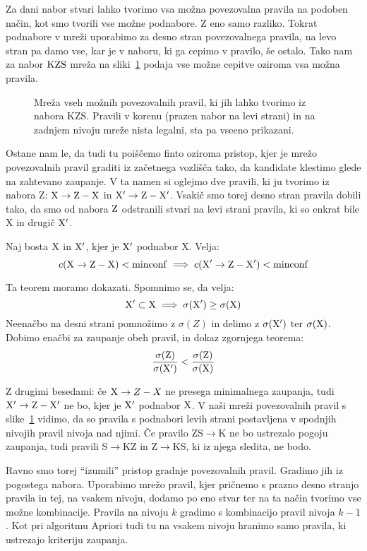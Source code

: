 Za dani nabor stvari lahko tvorimo vsa možna povezovalna pravila na podoben način, kot smo tvorili vse možne podnabore. Z eno samo razliko. Tokrat podnabore v mreži uporabimo za desno stran povezovalnega pravila, na levo stran pa damo vse, kar je v naboru, ki ga cepimo v pravilo, še ostalo. Tako nam za nabor ${\rm KZS}$ mreža na sliki~\ref{f:pravila-kzs} podaja vse možne cepitve oziroma vsa možna pravila.

\begin{figure}[htbp]
\caption{Mreža vseh možnih povezovalnih pravil, ki jih lahko tvorimo iz nabora KZS. Pravili v korenu (prazen nabor na levi strani) in na zadnjem nivoju mreže nista legalni, sta pa vseeno prikazani.}
\label{f:pravila-kzs}
\end{figure}

Ostane nam le, da tudi tu poiščemo finto oziroma pristop, kjer je mrežo povezovalnih pravil graditi iz začetnega vozlišča tako, da kandidate klestimo glede na zahtevano zaupanje. V ta namen si oglejmo dve pravili, ki ju tvorimo iz nabora Z: ${\rm X}\to {\rm Z}-{\rm X}$ in ${\rm X'}\to {\rm Z}-{\rm X}'$. Vsakič smo torej desno stran pravila dobili tako, da smo od nabora ${\rm Z}$ odstranili stvari na levi strani pravila, ki so enkrat bile X in drugič ${\rm X}'$.

\begin{teorem}
  Naj bosta ${\rm X}$ in ${\rm X}'$, kjer je ${\rm X}'$ podnabor {\rm X}. Velja:
  $$c({\rm X}\to {\rm Z}-{\rm X})<{\rm minconf}\implies c({\rm X}'\to {\rm Z}-{\rm X}')<{\rm minconf} $$
\end{teorem}
Ta teorem moramo dokazati. Spomnimo se, da velja:
$$ {\rm X}'\subset {\rm X}\implies\sigma({\rm X}')\geq\sigma({\rm X}) $$
Neenačbo na desni strani pomnožimo z $\sigma(Z)$ in delimo z $\sigma({\rm X}')$ ter $\sigma({\rm X})$. Dobimo enačbi za zaupanje obeh pravil, in dokaz zgornjega teorema:
$${\sigma({\rm Z})\over\sigma({\rm X}')} < {\sigma({\rm Z})\over\sigma({\rm X})}$$

Z drugimi besedami: če ${\rm X}\to Z-X$ ne presega minimalnega zaupanja, tudi ${\rm X'}\to {\rm Z}-{\rm X}'$ ne bo, kjer je ${\rm X}'$ podnabor ${\rm X}$. V naši mreži povezovalnih pravil s slike~\ref{f:pravila-kzs} vidimo, da so pravila s podnabori levih strani postavljena v spodnjih nivojih pravil nivoja nad njimi. Če pravilo ZS$\to$K ne bo ustrezalo pogoju zaupanja, tudi pravili S$\to$KZ in Z$\to$KS, ki iz njega sledita, ne bodo.

Ravno smo torej ``izumili'' pristop gradnje povezovalnih pravil. Gradimo jih iz pogostega nabora. Uporabimo mrežo pravil, kjer pričnemo s prazno desno stranjo pravila in tej, na vsakem nivoju, dodamo po eno stvar ter na ta način tvorimo vse možne kombinacije. Pravila na nivoju $k$ gradimo s kombinacijo pravil nivoja $k-1$. Kot pri algoritmu Apriori tudi tu na vsakem nivoju hranimo samo pravila, ki ustrezajo kriteriju zaupanja.

